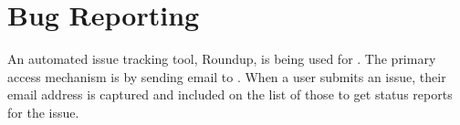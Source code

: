 %
%
%
%
%
%


\section{Bug Reporting}

An automated issue tracking tool, Roundup, is being used for \hypre{}. The primary
access mechanism is by sending email to .  When a
user submits an issue, their email address is captured and included on the list
of those to get status reports for the issue.
